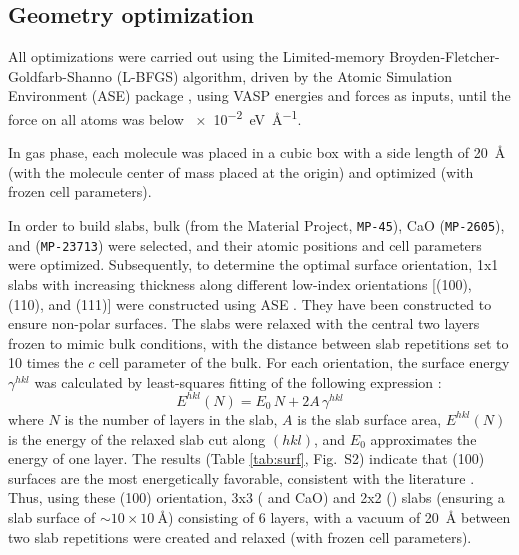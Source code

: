 \documentclass[journal=jpccck,manuscript=article]{achemso}
\begin{document}
\subsection{Geometry optimization} 
All optimizations were carried out using the Limited-memory Broyden-Fletcher-Goldfarb-Shanno  (L-BFGS) algorithm, driven by the Atomic Simulation Environment (ASE) package \cite{larsenAtomicSimulationEnvironment2017}, using VASP energies and forces as inputs, until the force on all atoms was below \SI{e-2}{\electronvolt\per\angstrom}.

In gas phase, each molecule was placed in a cubic box with a side length of \SI{20}{\angstrom} (with the molecule center of mass placed at the origin) and optimized (with frozen cell parameters).

In order to build slabs, bulk  (from the Material Project, \texttt{MP-45}), CaO (\texttt{MP-2605}), and  (\texttt{MP-23713}) were selected, and their atomic positions and cell parameters were optimized. Subsequently, to determine the optimal surface orientation, 1x1 slabs with increasing thickness along different low-index orientations [(100), (110), and (111)] were constructed using ASE \cite{larsenAtomicSimulationEnvironment2017}. They have been constructed to ensure non-polar surfaces. The slabs were relaxed with the central two layers frozen to mimic bulk conditions, with the distance between slab repetitions set to 10 times the $c$ cell parameter of the bulk. For each orientation, the surface energy $\gamma^{hkl}$ was calculated by least-squares fitting of the following expression \cite{sunEfficientCreationConvergence2013,tranSurfaceEnergiesElemental2016}:
\begin{equation}
	E^{hkl}(N) = E_0\,N + 2A\,\gamma^{hkl} \label{eq:surf}
\end{equation}
where $N$ is the number of layers in the slab, $A$ is the slab surface area, $E^{hkl}(N)$ is the energy of the relaxed slab cut along $(hkl)$, and $E_0$ approximates the energy of one layer. The results (Table \ref{tab:surf}, Fig.~S2) indicate that (100) surfaces are the most energetically favorable, consistent with the literature \cite{deleeuwDensityFunctionalTheory2000,ebadiInsightsLiMetalOrganic2019}. 
Thus, using these (100) orientation, 3x3 ( and CaO) and 2x2 () slabs (ensuring a slab surface of $\sim 10\times \SI{10}{\angstrom}$) consisting of 6 layers, with a vacuum of \SI{20}{\angstrom} between two slab repetitions were created and relaxed (with frozen cell parameters). 
\end{document}
